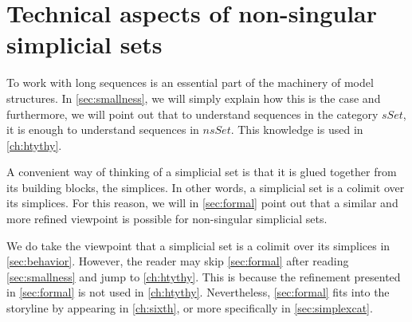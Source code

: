 
\chapter{Technical aspects of non-singular simplicial sets}
\label{ch:technical}

To work with long sequences is an essential part of the machinery of model structures. In \cref{sec:smallness}, we will simply explain how this is the case and furthermore, we will point out that to understand sequences in the category $sSet$, it is enough to understand sequences in $nsSet$. This knowledge is used in \cref{ch:htythy}.

A convenient way of thinking of a simplicial set is that it is glued together from its building blocks, the simplices. In other words, a simplicial set is a colimit over its simplices. For this reason, we will in \cref{sec:formal} point out that a similar and more refined viewpoint is possible for non-singular simplicial sets.

We do take the viewpoint that a simplicial set is a colimit over its simplices in \cref{sec:behavior}. However, the reader may skip \cref{sec:formal} after reading \cref{sec:smallness} and jump to \cref{ch:htythy}. This is because the refinement presented in \cref{sec:formal} is not used in \cref{ch:htythy}. Nevertheless, \cref{sec:formal} fits into the storyline by appearing in \cref{ch:sixth}, or more specifically in \cref{sec:simplexcat}.


